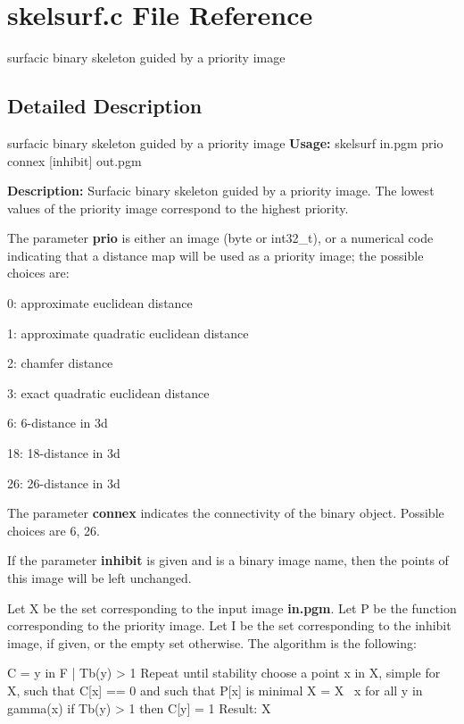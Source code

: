 \section{skelsurf.c File Reference}
\label{skelsurf_8c}


surfacic binary skeleton guided by a priority image  




\subsection{Detailed Description}
surfacic binary skeleton guided by a priority image {\bfseries Usage:} skelsurf in.pgm prio connex [inhibit] out.pgm

{\bfseries Description:} Surfacic binary skeleton guided by a priority image. The lowest values of the priority image correspond to the highest priority.

The parameter {\bfseries prio} is either an image (byte or int32\_\-t), or a numerical code indicating that a distance map will be used as a priority image; the possible choices are: \begin{DoxyItemize}
\item 0: approximate euclidean distance \item 1: approximate quadratic euclidean distance \item 2: chamfer distance \item 3: exact quadratic euclidean distance \item 6: 6-\/distance in 3d \item 18: 18-\/distance in 3d \item 26: 26-\/distance in 3d\end{DoxyItemize}
The parameter {\bfseries connex} indicates the connectivity of the binary object. Possible choices are 6, 26.

If the parameter {\bfseries inhibit} is given and is a binary image name, then the points of this image will be left unchanged.

Let X be the set corresponding to the input image {\bfseries in.pgm}. Let P be the function corresponding to the priority image. Let I be the set corresponding to the inhibit image, if given, or the empty set otherwise. The algorithm is the following:

\begin{DoxyVerb}
C = {y in F | Tb(y) > 1}
Repeat until stability
  choose a point x in X, simple for X, such that C[x] == 0 
    and such that P[x] is minimal
  X = X \ {x}
  for all y in gamma(x)
    if Tb(y) > 1 then C[y] = 1
Result: X
\end{DoxyVerb}


